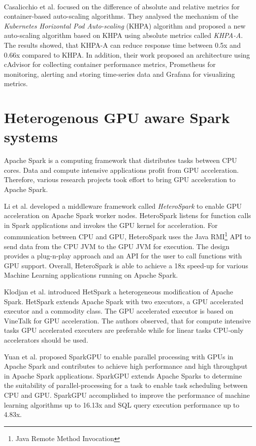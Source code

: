 \paragraph{}Casalicchio et al. \cite{Casalicchio2017AutoScaleCont} focused on the difference of absolute and relative metrics for container-based auto-scaling algorithms. They analysed the mechanism of the \textit{Kubernetes Horizontal Pod Auto-scaling} (KHPA) algorithm and proposed a new auto-scaling algorithm based on KHPA using absolute metrics called \textit{KHPA-A}. The results showed, that KHPA-A can reduce response time between 0.5x and 0.66x compared to KHPA. In addition, their work proposed an architecture using cAdvisor for collecting container performance metrics, Prometheus for monitoring, alerting and storing time-series data and Grafana for visualizing metrics.


\section{Heterogenous GPU aware Spark systems}
Apache Spark is a computing framework that distributes tasks between CPU cores. Data and compute intensive applications profit from GPU acceleration. Therefore, various research projects took effort to bring GPU acceleration to Apache Spark.


Li et al. \cite{Li2015HeteroSpark} developed a middleware framework called \textit{HeteroSpark} to enable GPU acceleration on Apache Spark worker nodes. HeteroSpark listens for function calls in Spark applications and invokes the GPU kernel for acceleration. For communication between CPU and GPU, HeteroSpark uses the Java RMI\footnote{Java Remote Method Invocation} API to send data from the CPU JVM to the GPU JVM for execution.
The design provides a plug-n-play approach and an API for the user to call functions with GPU support.
Overall, HeteroSpark is able to achieve a 18x speed-up for various Machine Learning applications running on Apache Spark.


Klodjan et al. \cite{Klodjan2018HetSpark} introduced HetSpark a heterogeneous modification of Apache Spark.
HetSpark extends Apache Spark with two executors, a GPU accelerated executor and a commodity class. The GPU accelerated executor is based on VineTalk\cite{Mavridis2017VineTalk} for GPU acceleration.
The authors observed, that for compute intensive tasks GPU accelerated executers are preferable while for linear tasks CPU-only accelerators should be used.


Yuan et al. \cite{Yuan2016SparkGPU} proposed SparkGPU to enable parallel processing with GPUs in Apache Spark and contributes to achieve high performance and high throughput in Apache Spark applications.
SparkGPU extends Apache Sparks to determine the suitability of parallel-processing for a task to enable task scheduling between CPU and GPU. 
SparkGPU accomplished to improve the performance of machine learning algorithms up to 16.13x and SQL query execution performance up to 4.83x.


